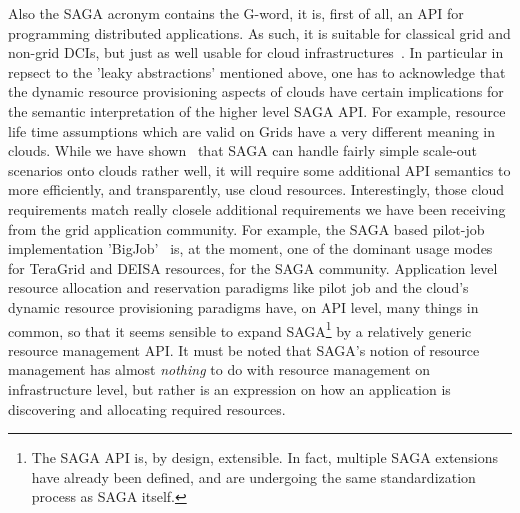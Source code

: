 \documentclass[10pt,conference,final,letterpaper,twoside,twocolumn,]{IEEEtran}
\newcommand{\I}[1]{\textit{#1}}
\begin{document}
  Also the SAGA acronym contains the G-word, it is, first of all, an
  API for programming distributed applications.  As such, it is
  suitable for classical grid and non-grid DCIs, but just as well
  usable for cloud infrastructures~\cite{sagacloud...}.  In particular
  in repsect to the 'leaky abstractions' mentioned above, one has to
  acknowledge that the dynamic resource provisioning aspects of clouds
  have certain implications for the semantic interpretation of the
  higher level SAGA API.  For example, resource life time assumptions
  which are valid on Grids have a very different meaning in clouds.
  While we have shown~\cite{sagacloud...} that SAGA can handle fairly
  simple scale-out scenarios onto clouds rather well, it will require
  some additional API semantics to more efficiently, and
  transparently, use cloud resources.  Interestingly, those cloud
  requirements match really closele additional requirements we have
  been receiving from the grid application community.  For example,
  the SAGA based pilot-job implementation 'BigJob'~\cite{bigjob} is,
  at the moment, one of the dominant usage modes for TeraGrid and
  DEISA resources, for the SAGA community.  Application level resource
  allocation and reservation paradigms like pilot job and the cloud's
  dynamic resource provisioning paradigms have, on API level, many
  things in common, so that it seems sensible to expand
  SAGA\footnote{The SAGA API is, by design, extensible.  In fact,
  multiple SAGA extensions have already been defined, and are
  undergoing the same standardization process as SAGA itself.} by a
  relatively generic resource management API.  It must be noted that
  SAGA's notion of resource management has almost \I{nothing} to do
  with resource management on infrastructure level, but rather is an
  expression on how an application is discovering and allocating
  required resources.
  

\end{document}
